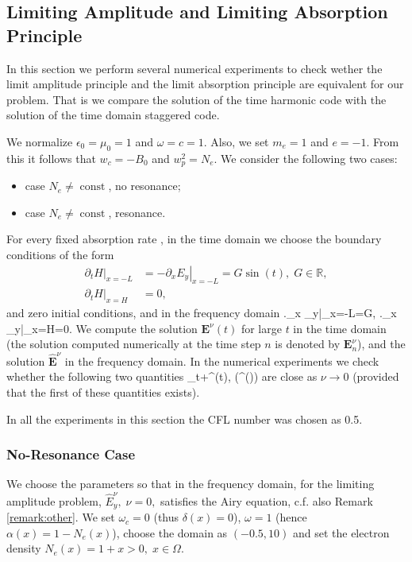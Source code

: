 \subsection{Limiting Amplitude and Limiting Absorption Principle}
In this section we perform several numerical experiments to check wether the limit amplitude
principle and the limit
absorption principle are equivalent for our problem.
That is we compare the solution of the time harmonic code with the solution of the time domain staggered code.

We normalize  $\epsilon_0=\mu_0=1$ and $\omega=c=1$. 
Also, we set $m_e=1$ and $e=-1$. From this it follows that $w_c=-B_0$ and $w_p^2=N_e$. 
We consider the following two cases:
\begin{itemize}
 \item case $N_e\neq \operatorname{const}$, no resonance;
 \item case $N_e\neq \operatorname{const}$, resonance.
\end{itemize}
For every fixed absorption rate , in the time domain we choose the boundary conditions of the form
\begin{align}
\label{eq:bcs}
\left.\partial_t H\right|_{x=-L}&=-\left.\partial_x E_y\right|_{x=-L}=G\sin(t),\; G\in \mathbb{R}, \\
 \nonumber
 \left.\partial_t H\right|_{x=H}&=0,
\end{align}
and zero initial conditions, and in the frequency domain
\bealn
 \left.\partial_x _y\right|_{x=-L}=G,\; \left.\partial_x _y\right|_{x=H}=0.
\eealn
We compute the solution $\mathbf{E}^{\nu}(t)$ for large $t$ in the time domain 
(the solution computed numerically at the time step $n$ is denoted by $\mathbf{E}^{\nu}_{n}$), and the solution $\hat{\mathbf{E}}^{\nu}$ in the frequency domain. 
In the numerical experiments we check whether the following two quantities
\ben
\lim_{t\rightarrow+\infty}^{\nu}(t),  \Im\left(^{\nu}\exp()\right)
\een
are close as $\nu\rightarrow 0$ (provided that the first of these quantities exists). 

In all the experiments in this section the CFL number was chosen as 0.5.
\subsubsection{No-Resonance Case}
\label{section:absorption_airy}
We choose the parameters so that in the frequency domain, for the limiting amplitude problem, $\hat{E}_{y}^{\nu},\; \nu=0,$ satisfies 
the Airy equation, c.f. also Remark \ref{remark:other}. We set $\omega_c=0$ (thus $\delta(x)=0$), $\omega=1$ (hence $\alpha(x)=1-N_e(x)$), 
choose the domain as $(-0.5, 10)$ and set the electron density $N_e(x)=1+x>0,\; x\in \Omega$. 

